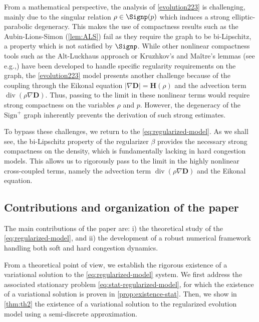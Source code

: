 \documentclass[final,reqno]{amsart}
\theoremstyle{plain}
\theoremstyle{definition}
\theoremstyle{remark}
\numberwithin{remark}{section}	%
\numberwithin{example}{section}	%
\DeclareMathOperator{\dive}{div}
\newcommand{\de}{\mathbf{D}}
\newcommand{\he}{\mathbf{H}}
\newcommand{\eg}{e.g.,\xspace}	%
\begin{document}
From a mathematical perspective, the analysis of \eqref{evolution223} is challenging, mainly due to the singular relation $\rho \in \Signp(p)$ which induces a strong elliptic-parabolic degeneracy. This makes the use of compactness results such as the Aubin-Lions-Simon (\cref{lem:ALS}) fail as they require the graph to be bi-Lipschitz, a property which is not satisfied by $\Signp$. While other nonlinear compactness tools such as the Alt-Luckhaus approach \cite{Alt&Luckhaus} or Kruzhkov's and Ma\^itre's lemmas (see \eg \cite{EM,BA,SK}) have been developed to handle specific regularity requirements on the graph, the \eqref{evolution223} model presents another challenge because of the coupling through the Eikonal equation $\vert \nabla \de \vert = \he(\rho)$ and the advection term $\dive(\rho \nabla \de)$. Thus, passing to the limit in these nonlinear terms would require strong compactness on the variables $\rho$ and $p$. However, the degeneracy of the $\text{Sign}^+$ graph inherently prevents the derivation of such strong estimates. 

To bypass these challenges, we return to the \eqref{eq:regularized-model}. As we shall see, the bi-Lipschitz property of the regularizer $\beta$ provides the necessary strong compactness on the density, which is fundamentally lacking in hard congestion models. This allows us to rigorously pass to the limit in the highly nonlinear cross-coupled terms, namely the advection term $\dive(\rho \nabla \de)$ and the Eikonal equation.
\subsection{Contributions and organization of the paper}
 The main contributions of the paper are: i) the theoretical study of the \eqref{eq:regularized-model}, and ii) the development of a robust numerical framework handling both soft and hard congestion dynamics.

From a theoretical point of view, we establish the rigorous existence of a variational solution to the \eqref{eq:regularized-model} system. We first address the associated stationary problem \eqref{eq:stat-regularized-model}, for which the existence of a variational solution is proven in \cref{prop:existence-stat}. Then, we show in \cref{thm:th2} the existence of a variational solution to the regularized evolution model using a semi-discrete approximation.
\end{document}
